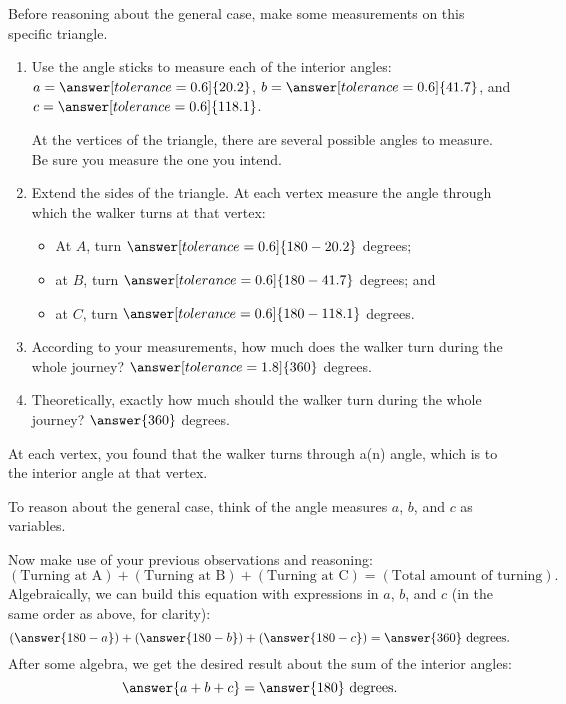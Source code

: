 \documentclass[nooutcomes,noauthor]{ximera}
\begin{document}
\begin{problem}
\begin{problem}
Before reasoning about the general case, make some measurements on this specific triangle.  
\begin{enumerate}
\item Use the angle sticks to measure each of the interior angles: $a=\answer[tolerance=0.6]{20.2}$, $b=\answer[tolerance=0.6]{41.7}$, and $c=\answer[tolerance=0.6]{118.1}$.
\begin{hint}
At the vertices of the triangle, there are several possible angles to measure.  Be sure you measure the one you intend. 
\end{hint}
\item Extend the sides of the triangle.  At each vertex measure the angle through which the walker turns at that vertex:  
\begin{itemize}
\item At $A$, turn $\answer[tolerance=0.6]{180-20.2}$ degrees;  
\item at $B$, turn $\answer[tolerance=0.6]{180-41.7}$ degrees; and 
\item at $C$, turn $\answer[tolerance=0.6]{180-118.1}$ degrees.
\end{itemize}
\item According to your measurements, how much does the walker turn during the whole journey?  $\answer[tolerance=1.8]{360}$ degrees.
\item Theoretically, exactly how much should the walker turn during the whole journey?  $\answer{360}$ degrees.
\end{enumerate}

\begin{problem}
At each vertex, you found that the walker turns through a(n) 
 angle, which is 
 to the interior angle at that vertex.  

To reason about the general case, think of the angle measures $a$, $b$, and $c$ as variables.  


Now make use of your previous observations and reasoning:  
\[
\left(\text{Turning at A}\right) + \left(\text{Turning at B}\right) + \left(\text{Turning at C}\right) = \left(\text{Total amount of turning}\right).
\]
Algebraically, we can build this equation with expressions in $a$, $b$, and $c$ (in the same order as above, for clarity):  
\[
\left(\answer{180-a}\right) + \left(\answer{180-b}\right) + \left(\answer{180-c}\right)  = \answer{360} \text{ degrees.}
\]
After some algebra, we get the desired result about the sum of the interior angles:  
\[
\answer{a+b+c}=\answer{180} \text{ degrees}. 
\]

\end{problem}
\end{problem}
\end{problem}
\end{document}
